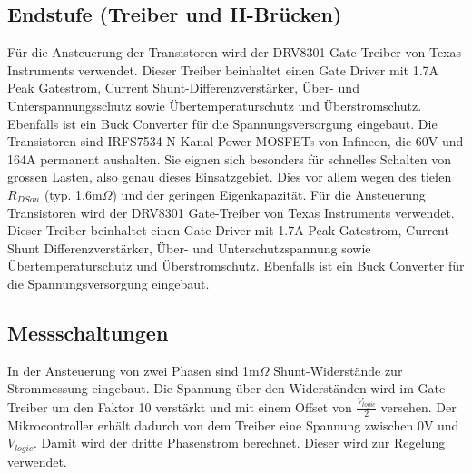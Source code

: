 \subsection*{Endstufe (Treiber und H-Brücken)}
Für die Ansteuerung der Transistoren wird der DRV8301 Gate-Treiber von Texas Instruments verwendet. Dieser Treiber beinhaltet einen Gate Driver mit 1.7A Peak Gatestrom, Current Shunt-Differenzverstärker, Über- und Unterspannungsschutz sowie Übertemperaturschutz und Überstromschutz. Ebenfalls ist ein Buck Converter für die Spannungsversorgung eingebaut.
Die Transistoren sind IRFS7534 N-Kanal-Power-MOSFETs von Infineon, die 60V und 164A permanent aushalten. Sie eignen sich besonders für schnelles Schalten von grossen Lasten, also genau dieses Einsatzgebiet. Dies vor allem wegen des tiefen $R_{DSon}$ (typ. 1.6m\(\Omega\)) und der geringen Eigenkapazität. 
Für die Ansteuerung Transistoren wird der DRV8301 Gate-Treiber von Texas Instruments verwendet. Dieser Treiber beinhaltet einen Gate Driver mit 1.7A Peak Gatestrom, Current Shunt Differenzverstärker, Über- und Unterschutzspannung sowie Übertemperaturschutz und Überstromschutz. Ebenfalls ist ein Buck Converter für die Spannungsversorgung eingebaut.

\subsection*{Messschaltungen}
In der Ansteuerung von zwei Phasen sind 1m\(\Omega\) Shunt-Widerstände zur Strommessung eingebaut. Die Spannung über den Widerständen wird im Gate-Treiber um den Faktor 10 verstärkt und mit einem Offset von $\frac{V_{logic}}{2}$ versehen. Der Mikrocontroller erhält dadurch von dem Treiber eine Spannung zwischen 0V und $V_{logic}$. Damit wird der dritte Phasenstrom berechnet. Dieser wird zur Regelung verwendet.
